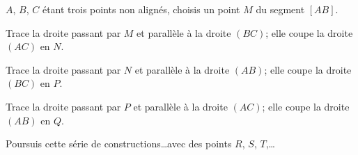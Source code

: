 $A$, $B$, $C$ étant trois points non alignés, choisis un point $M$ du
segment $[AB]$.
\par Trace la droite passant par $M$ et parallèle à la droite $(BC)$; elle
coupe la droite $(AC)$ en $N$.
\par Trace la droite passant par $N$ et parallèle à la droite $(AB)$; elle
coupe la droite $(BC)$ en $P$.
\par Trace la droite passant par $P$ et parallèle à la droite $(AC)$; elle
coupe la droite $(AB)$ en $Q$.
\par Poursuis cette série de constructions\ldots avec des points $R$,
$S$, $T$,\ldots
